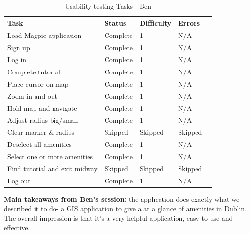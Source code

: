\begin{table}[h!]
    \centering
    \caption{Usability testing Tasks - Ben}
    \begin{tabular}{|p{}|p{}|p{}|p{}|p{}|}
        \hline
        \textbf{Task}                 & \textbf{Status} & \textbf{Difficulty} & \textbf{Errors} \\
        \hline
        Load Magpie application       & Complete        & 1                   & N/A             \\
        \hline
        Sign up                       & Complete        & 1                   & N/A             \\
        \hline
        Log in                        & Complete        & 1                   & N/A             \\
        \hline
        Complete tutorial             & Complete        & 1                   & N/A             \\
        \hline
        Place cursor on map           & Complete        & 1                   & N/A             \\
        \hline
        Zoom in and out               & Complete        & 1                   & N/A             \\
        \hline
        Hold map and navigate         & Complete        & 1                   & N/A             \\
        \hline
        Adjust radius big/small       & Complete        & 1                   & N/A             \\
        \hline
        Clear marker \& radius        & Skipped         & Skipped             & Skipped         \\
        \hline
        Deselect all amenities        & Complete        & 1                   & N/A             \\
        \hline
        Select one or more amenities  & Complete        & 1                   & N/A             \\
        \hline
        Find tutorial and exit midway & Skipped         & Skipped             & Skipped         \\
        \hline
        Log out                       & Complete        & 1                   & N/A             \\
        \hline
    \end{tabular}
\end{table}
\textbf{Main takeaways from Ben's session: }the application does exactly what we described it to do- a GIS application to give a at a glance of amenities in Dublin. The overall impression is that it's a very helpful application, easy to use and effective.\\
